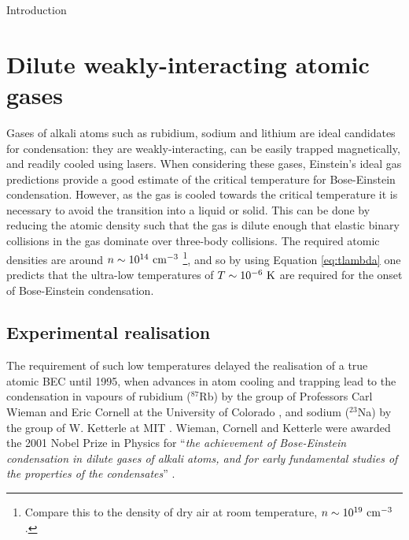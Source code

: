 \begin{chapter}{\label{cha:bose_gases}Introduction}
\section{Dilute weakly-interacting atomic gases}
Gases of alkali atoms such as rubidium, sodium and lithium are ideal candidates for condensation: they are weakly-interacting, can be easily trapped magnetically, and readily cooled using lasers. When considering these gases, Einstein's ideal gas predictions provide a good estimate of the critical temperature for Bose-Einstein condensation.  However, as the gas is cooled towards the critical temperature it is necessary to avoid the transition into a liquid or solid. This can be done by reducing the atomic density such that the gas is dilute enough that elastic binary collisions in the gas dominate over three-body collisions. The required atomic densities are around $n \sim 10^{14}~{\rm cm}^{-3}$ \footnote{Compare this to the density of dry air at room temperature, $n \sim 10^{19}~{\rm cm}^{-3}$.}, and so by using Equation \ref{eq:tlambda} one predicts that the ultra-low temperatures of $T \sim 10^{-6}~{\rm K}$ are required for the onset of Bose-Einstein condensation.

\subsection{Experimental realisation}
The requirement of such low temperatures delayed the realisation of a true atomic BEC until 1995, when advances in atom cooling and trapping \cite{billphillips,chu98,Cohen-Tannoudji} lead to the condensation in vapours of rubidium ($^{87}$Rb) by the group of Professors Carl Wieman and Eric Cornell at the University of Colorado \cite{Anderson198}, and sodium ($^{23}$Na) by the group of W. Ketterle at MIT \cite{PhysRevLett.75.3969}. Wieman, Cornell and Ketterle were awarded the 2001 Nobel Prize in Physics for ``{\it the achievement of Bose-Einstein condensation in dilute gases of alkali atoms, and for early fundamental studies of the properties of the condensates}'' \cite{nobel01}.


\end{chapter}
